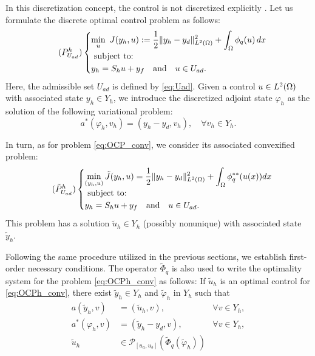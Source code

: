 In this discretization concept, the control is not discretized explicitly \cite{hinze05}. Let us formulate the  discrete optimal control problem as follows: 
\begin{equation}
\tag{$P^h_{U_{ad}}$} \label{eq:OCP_h}
\begin{cases}
	\displaystyle\min_{u}~ J(y_h,u):=\frac{1}{2}\| y_h -y_d \|^2_{L^2(\om)}+\int_{\Omega}\phi_q(u)\,dx\\
	\hbox{ subject to: }\\
    y_h = S_h u + y_f \quad\text{and}\quad	u \in U_{ad}.
\end{cases}
\end{equation}
Here, the admissible set $U_{ad}$ is defined by \eqref{eq:Uad}.  Given a control $u\in  L^2(\Omega)$ with associated state $y_h \in Y_h$, we introduce the discretized adjoint state $\varphi_h$ as the solution of the following variational problem: 
\begin{equation}
	a^*(  \varphi_h,v_h) = (y_h - y_d,v_h),    \quad\forall v_h\in Y_h.
\end{equation}

In turn, as for problem \eqref{eq:OCP_conv}, we consider its associated convexified problem:
\begin{equation}
		\tag{$\tilde P^h_{U_{ad}}$} \label{eq:OCPh_conv}
		\begin{cases}
			\displaystyle\min_{(y_h,u)} \tilde J(y_h, u) = \frac12 \norm{y_h-y_d}^2_{L^2(\om)} + \int_\om \phi_q^{**} (u(x)) dx\\
	\hbox{ subject to: }\\
    y_h = S_h u +y_f \quad\text{and}\quad	u \in U_{ad}.
		\end{cases}
\end{equation}
This problem has a solution $\tilde u_h \in Y_h$ (possibly nonunique) with associated state $\tilde y_h$.



Following the same procedure utilized in the previous sections, we establish first-order necessary conditions. The operator $\tilde\Phi_{q}$ is also used to write the optimality system for the problem \eqref{eq:OCPh_conv} as follows: If $\tilde u_h$ is an optimal control for \eqref{eq:OCPh_conv}, there exist $\tilde y_h \in Y_h$ and $\tilde\varphi_h$ in $Y_h$ such that
%
\begin{subequations}\label{eq:system3}
		\begin{align} 
				 a(\tilde y_h,v) &= (\tilde u_h,v), &\forall v \in Y_h, \\
				a^*(  \varphi_h,v) &= (\tilde y_h - y_d,v),    &\forall  v\in Y_h, \label{eq:adjoint_h}\\
			\tilde u_h  &\in \mathcal{P}_{[u_a,u_b]}(\tilde\Phi_q (\tilde\varphi_h)) \label{eq:uPhi_h}
		\end{align} 	
\end{subequations}


